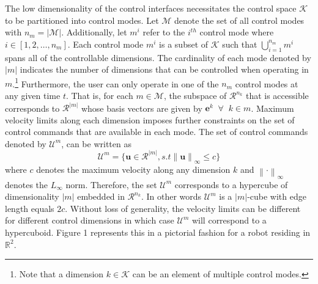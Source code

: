 \documentclass[conference]{IEEEtran}
\newcommand{\norm}[1]{\left\lVert#1\right\rVert}
\begin{document}
The low dimensionality of the control interfaces necessitates the control space $\mathcal{K}$ to be partitioned into control modes. Let $\mathcal{M}$ denote the set of all control modes with $n_m = \vert\mathcal{M}\vert$. Additionally, let $m^i$ refer to the $i^{th}$ control mode where $i \in [1,2,\dots,n_m]$. Each control mode $m^i$ is a subset of $\mathcal{K}$ such that $\bigcup\limits_{i=1}^{n_m} m^i$ spans all of the controllable dimensions. The cardinality of each mode denoted by $\vert m \vert$ indicates the number of dimensions that can be controlled when operating in $m$.\footnote{Note that a dimension $k \in \mathcal{K}$ can be an element of multiple control modes.} Furthermore, the user can only operate in one of the $n_m$ control modes at any given time $t$. That is, for each $m \in \mathcal{M}$, the subspace of $\mathcal{R}^{n_k}$ that is accessible corresponds to $\mathcal{R}^{\vert m \vert}$ whose basis vectors are given by $\boldsymbol{e}^k \;\; \forall \;\; k \in m$. Maximum velocity limits along each dimension imposes further constraints on the set of control commands that are available in each mode. The set of control commands denoted by $\mathcal{U}^m$, can be written as 
\begin{equation*}
\mathcal{U}^m = \{\boldsymbol{u} \in \mathcal{R}^{\vert m \vert}, s.t \norm{\boldsymbol{u}}_{\infty} \leq c \} 
\end{equation*}
where $c$ denotes the maximum velocity along any dimension $k$ and $\norm{\cdot}_{\infty}$ denotes the $L_\infty$ norm. Therefore, the set $\mathcal{U}^m$ corresponds to a hypercube of dimensionality $\vert m \vert$ embedded in $\mathcal{R}^{n_k}$. In other words $\mathcal{U}^m$ is a $\vert m \vert$-cube with edge length equals $2c$. Without loss of generality, the velocity limits can be different for different control dimensions in which case $\mathcal{U}^m$ will correspond to a hypercuboid. Figure 1 represents this in a pictorial fashion for a robot residing in $\mathbb{R}^2$. 
\end{document}

